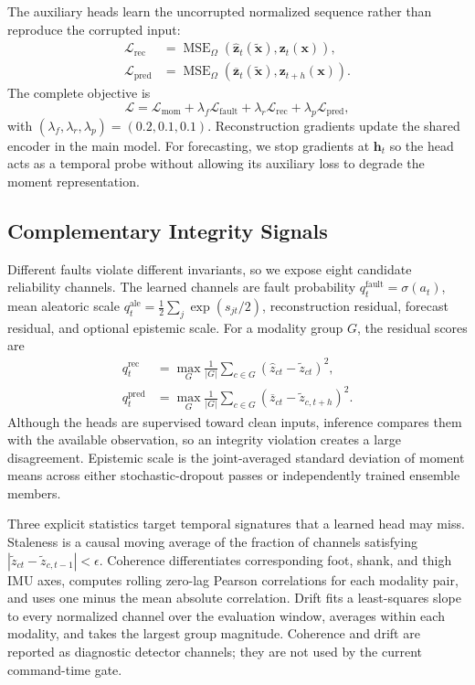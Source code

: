 \documentclass[letterpaper]{article} %
\begin{document}
The auxiliary heads learn the uncorrupted normalized sequence rather than reproduce the corrupted input:
\begin{align}
\mathcal{L}_{\mathrm{rec}} & = \operatorname{MSE}_{\Omega}
\left(\widehat{\mathbf{z}}_t(\widetilde{\mathbf{x}}),\mathbf{z}_t(\mathbf{x})\right),\\
\mathcal{L}_{\mathrm{pred}} & = \operatorname{MSE}_{\Omega}
\left(\overline{\mathbf{z}}_t(\widetilde{\mathbf{x}}),\mathbf{z}_{t+h}(\mathbf{x})\right).
\end{align}
The complete objective is
\begin{equation}
    \mathcal{L}=\mathcal{L}_{\mathrm{mom}}+
    \lambda_f\mathcal{L}_{\mathrm{fault}}+
    \lambda_r\mathcal{L}_{\mathrm{rec}}+
    \lambda_p\mathcal{L}_{\mathrm{pred}},
\end{equation}
with $(\lambda_f,\lambda_r,\lambda_p)=(0.2,0.1,0.1)$.
Reconstruction gradients update the shared encoder in the main model.
For forecasting, we stop gradients at $\mathbf{h}_t$ so the head acts as a temporal probe without allowing its auxiliary loss to degrade the moment representation.

\subsection{Complementary Integrity Signals}

Different faults violate different invariants, so we expose eight candidate reliability channels.
The learned channels are fault probability $q_t^{\mathrm{fault}}=\sigma(a_t)$, mean aleatoric scale $q_t^{\mathrm{ale}}=\frac{1}{2}\sum_j\exp(s_{jt}/2)$, reconstruction residual, forecast residual, and optional epistemic scale.
For a modality group $G$, the residual scores are
\begin{align}
q_t^{\mathrm{rec}} &= \max_G\frac{1}{|G|}\sum_{c\in G}
(\widehat z_{ct}-\widetilde z_{ct})^2,\\
q_t^{\mathrm{pred}} &= \max_G\frac{1}{|G|}\sum_{c\in G}
(\overline z_{ct}-\widetilde z_{c,t+h})^2.
\end{align}
Although the heads are supervised toward clean inputs, inference compares them with the available observation, so an integrity violation creates a large disagreement.
Epistemic scale is the joint-averaged standard deviation of moment means across either stochastic-dropout passes or independently trained ensemble members.

Three explicit statistics target temporal signatures that a learned head may miss.
Staleness is a causal moving average of the fraction of channels satisfying $|\widetilde z_{ct}-\widetilde z_{c,t-1}|<\epsilon$.
Coherence differentiates corresponding foot, shank, and thigh IMU axes, computes rolling zero-lag Pearson correlations for each modality pair, and uses one minus the mean absolute correlation.
Drift fits a least-squares slope to every normalized channel over the evaluation window, averages within each modality, and takes the largest group magnitude.
Coherence and drift are reported as diagnostic detector channels; they are not used by the current command-time gate.
\end{document}
